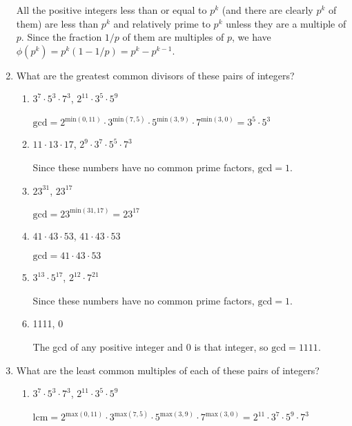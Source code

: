 \documentclass[11pt]{article}
\begin{document}
\begin{enumerate}[label=\textbf{\arabic*.}]
	All the positive integers less than or equal to $p^k$ (and there are clearly $p^k$ of them) are less than $p^k$ and relatively prime to $p^k$ unless they are a multiple of $p$. Since the fraction $1 / p$ of them are multiples of $p$, we have $\phi(p^k) = p^k (1 - 1 / p) = p^k - p^{k - 1}$.
	
	\pagebreak
	\item What are the greatest common divisors of these pairs of integers?
	
	\begin{enumerate}[label=\textbf{\alph*)}]
		\item $3^7 \cdot 5^3 \cdot 7^3$, $2^{11} \cdot 3^5 \cdot 5^9$
		
		$\text{gcd} = 2^{\text{min}(0, 11)} \cdot 3^{\text{min}(7, 5)} \cdot 5^{\text{min}(3, 9)} \cdot 7^{\text{min}(3, 0)} = 3^5 \cdot 5^3$
		
		\item $11 \cdot 13 \cdot 17$, $2^9 \cdot 3^7 \cdot 5^5 \cdot 7^3$
		
		Since these numbers have no common prime factors, $\text{gcd} = 1$.
		
		\item $23^{31}$, $23^{17}$
		
		$\text{gcd} = 23^{\text{min}(31, 17)} = 23^{17}$
		
		\item $41 \cdot 43 \cdot 53$, $41 \cdot 43 \cdot 53$
		
		$\text{gcd} = 41 \cdot 43 \cdot 53$
		
		\item $3^{13} \cdot 5^{17}$, $2^{12} \cdot 7^{21}$
		
		Since these numbers have no common prime factors, $\text{gcd} = 1$.
		
		\item 1111, 0
		
		The gcd of any positive integer and 0 is that integer, so $\text{gcd} = 1111$.
	\end{enumerate}

	\item What are the least common multiples of each of these pairs of integers?
	
	\begin{enumerate}[label=\textbf{\alph*)}]
		\item $3^7 \cdot 5^3 \cdot 7^3$, $2^{11} \cdot 3^5 \cdot 5^9$
		
		$\text{lcm} = 2^{\text{max}(0, 11)} \cdot 3^{\text{max}(7, 5)} \cdot 5^{\text{max}(3, 9)} \cdot 7^{\text{max}(3, 0)} = 2^{11} \cdot 3^7 \cdot 5^9 \cdot 7^3$
		

\end{enumerate}
\end{enumerate}
\end{document}
